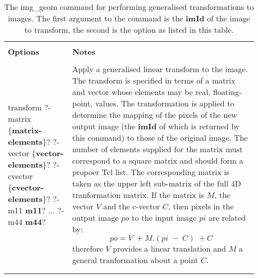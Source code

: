 \begin{table}
\begin{tabular}{|l||l|}
\hline
& \\
{\bf Options} & {\bf Notes} \\
& \\ \hline
\begin{minipage}[t]{4.0cm}
\flushleft
transform 
\newline
?-matrix \{{\bf matrix-elements}\}?
\newline
?-vector \{{\bf vector-elements}\}?
\newline
?-cvector \{{\bf cvector-elements}\}?
\newline
?-m11 {\bf m11}? ... ?-m44 {\bf m44}?
\end{minipage} &
\begin{minipage}[t]{11.0cm}
Apply a generalised linear transform to the image.  The transform
is specified in terms of a matrix and vector whose elements may be
real, floating-point, values.  The transformation is applied to determine
the mapping of the pixels of the new output image (the {\bf imId} of which is
returned by this command) to those of the original image.  The number
of elements supplied for the matrix must correspond to a square matrix
and should form a propoer Tcl list.  The corresponding matrix is taken
as the upper left sub-matrix of the full 4D tranformation matrix.
If the matrix is $M$, the vector $V$ and the c-vector $C$, then
pixels in the output image $po$ to the input image $pi$ are related by:
\[
po = V \; + M.(pi \; - \; C) \; + C
\]
therefore $V$ provides a linear translation and $M$ a general tranformation
about a point $C$.
\end{minipage} \\
& \\
& \\ \hline
\end{tabular}
\caption{The img\_geom command for performing generalised
transformations to images.  The first argument to the command is
the {\bf imId} of the image to transform, the second is the option
as listed in this table.}
\end{table}


